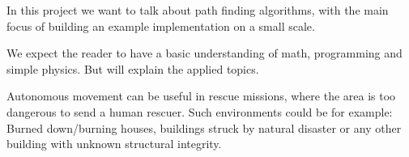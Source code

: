 


In this project we want to talk about path finding algorithms,
with the main focus of building an example implementation on a small scale.

We expect the reader to have a basic understanding of math, programming and simple physics.
But will explain the applied topics.

Autonomous movement can be useful in rescue missions,
where the area is too dangerous to send a human rescuer.
Such environments could be for example:
Burned down/burning houses, buildings struck by natural disaster
or any other building with unknown structural integrity.
